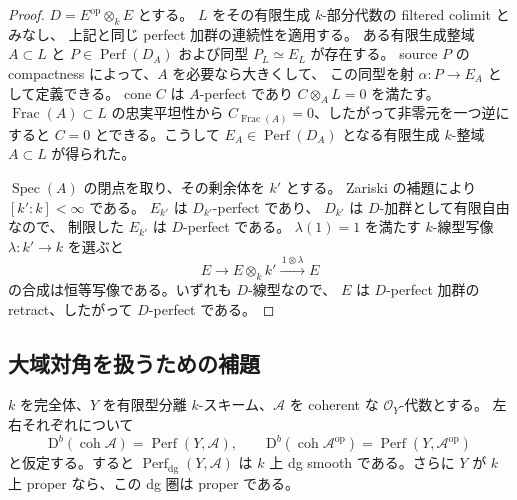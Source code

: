 \begin{proof}
\(D=E^{\mathrm{op}}\otimes_k E\) とする。
\(L\) をその有限生成 \(k\)-部分代数の filtered colimit とみなし、
上記と同じ perfect 加群の連続性を適用する。
ある有限生成整域 \(A\subset L\) と \(P\in\operatorname{Perf}(D_A)\)
および同型 \(P_L\simeq E_L\) が存在する。
source \(P\) の compactness によって、\(A\) を必要なら大きくして、
この同型を射 \(\alpha:P\to E_A\) として定義できる。
cone \(C\) は \(A\)-perfect であり \(C\otimes_A L=0\) を満たす。
\(\operatorname{Frac}(A)\subset L\) の忠実平坦性から
\(C_{\operatorname{Frac}(A)}=0\)、したがって非零元を一つ逆にすると
\(C=0\) とできる。こうして \(E_A\in\operatorname{Perf}(D_A)\)
となる有限生成 \(k\)-整域 \(A\subset L\) が得られた。

\(\operatorname{Spec}(A)\) の閉点を取り、その剰余体を \(k'\) とする。
Zariski の補題により \([k':k]<\infty\) である。
\(E_{k'}\) は \(D_{k'}\)-perfect であり、
\(D_{k'}\) は \(D\)-加群として有限自由なので、
制限した \(E_{k'}\) は \(D\)-perfect である。
\(\lambda(1)=1\) を満たす \(k\)-線型写像 \(\lambda:k'\to k\) を選ぶと
\[
 E\longrightarrow E\otimes_k k'
   \xrightarrow{\,1\otimes\lambda\,}E
\]
の合成は恒等写像である。いずれも \(D\)-線型なので、
\(E\) は \(D\)-perfect 加群の retract、したがって \(D\)-perfect である。
\end{proof}

\subsection{大域対角を扱うための補題}

\begin{proposition}
\label{prop:seed-finite-central-global-smooth}
$k$ を完全体、$Y$ を有限型分離 $k$-スキーム、$\mathscr A$ を
coherent な $\mathcal O_Y$-代数とする。
左右それぞれについて
\[
 \mathrm D^b(\operatorname{coh}\mathscr A)
   =\operatorname{Perf}(Y,\mathscr A),\qquad
 \mathrm D^b(\operatorname{coh}\mathscr A^{\mathrm{op}})
   =\operatorname{Perf}(Y,\mathscr A^{\mathrm{op}})
\]
と仮定する。すると $\operatorname{Perf}_{\mathrm{dg}}(Y,\mathscr A)$ は
$k$ 上 dg smooth である。さらに $Y$ が $k$ 上 proper なら、この dg 圏は proper である。
\end{proposition}

